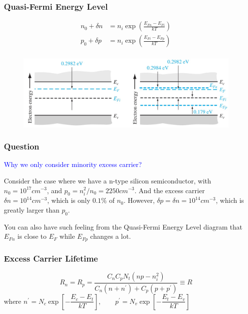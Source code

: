 \documentclass{beamer}
\begin{document}
    \begin{frame} \frametitle{Quasi-Fermi Energy Level}
        \begin{equation*}
            \begin{aligned}
                n_0 + \delta n &= n_i \exp \left( \frac{E_{Fn} - E_{Fi}}{kT}  \right) \\
                p_0 + \delta p &= n_i \exp \left( \frac{E_{Fi} - E_{Fp}}{kT}  \right) \\
            \end{aligned}
        \end{equation*}
        \begin{figure}[H]
            \centering
            \includegraphics[width=\linewidth]{Quasi-fermi-level.jpg}
            \label{fig:Quasi-fermi-level.jpg}
        \end{figure}
    \end{frame}

    \begin{frame} \frametitle{Question}
        \textcolor{blue}{Why we only consider minority excess carrier?} \\
        \par Consider the case where we have a n-type silicon semiconductor, with $n_0 = 10^{17}cm ^{-3}$, and $p_0 = n_i^2 / n_0 = 2250cm^{-3}$. And the excess carrier $\delta n = 10^{14} cm^{-3}$, which is only $0.1\%$ of $n_0$. However, $\delta p = \delta n = 10^{14} cm^{-3}$, which is greatly larger than $p_0$.
        \par You can also have such feeling from the Quasi-Fermi Energy Level diagram that $E_{Fn}$ is close to $E_F$ while $E_{Fp}$ changes a lot.
    \end{frame}

    \begin{frame} \frametitle{Excess Carrier Lifetime}
        \begin{equation*}
            \boxed{R_n = R_p = \frac{C_n C_p N_t (np - n_i^2)}{C_n (n + n^\prime) + C_p(p + p^\prime)} \equiv R}
        \end{equation*}
        where $n^\prime = N_c \exp\left[ - \dfrac{E_c - E_t}{kT}  \right],   \qquad p^\prime = N_v \exp \left[ - \dfrac{E_t - E_v}{kT}  \right]$
    \end{frame}
\end{document}
